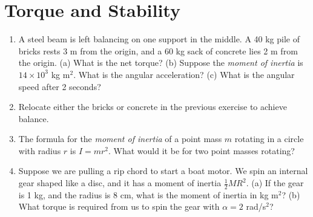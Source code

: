 \documentclass{article}
\begin{document}
\section{Torque and Stability}

\begin{enumerate}
\item A steel beam is left balancing on one support in the middle.  A 40 kg pile of bricks rests 3 m from the origin, and a 60 kg sack of concrete lies 2 m from the origin.  (a) What is the net torque? (b) Suppose the \textit{moment of inertia} is $14\times 10^3$ kg m$^2$.  What is the angular acceleration? (c) What is the angular speed after 2 seconds? \\ \vspace{4cm}
\item Relocate either the bricks or concrete in the previous exercise to achieve balance. \\ \vspace{3cm}
\item The formula for the \textit{moment of inertia} of a point mass $m$ rotating in a circle with radius $r$ is $I = mr^2$.  What would it be for two point masses rotating? \\ \vspace{1cm}
\item Suppose we are pulling a rip chord to start a boat motor.  We spin an internal gear shaped like a disc, and it has a moment of inertia $\frac{1}{2}M R^2$.  (a) If the gear is 1 kg, and the radius is 8 cm, what is the moment of inertia in kg m$^2$? (b) What torque is required from us to spin the gear with $\alpha = 2$ rad/s$^2$?
\end{enumerate}
\end{document}
